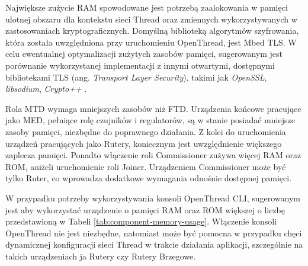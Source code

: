 Największe zużycie RAM spowodowane jest potrzebą zaalokowania w pamięci ulotnej obszaru dla kontekstu sieci Thread oraz zmiennych wykorzystywanych w zastosowaniach kryptograficznych. Domyślną biblioteką algorytmów szyfrowania, która została uwzględniona przy uruchomieniu OpenThread, jest Mbed TLS. W celu ewentualnej optymalizacji zużytych zasobów pamięci, sugerowanym jest porównanie wykorzystanej implementacji z innymi otwartymi, dostępnymi bibliotekami TLS (ang. \textit{Transport Layer Security}), takimi jak \textit{OpenSSL}, \textit{libsodium}, \textit{Crypto++} \cite{mbed-tls-alt}. 

Rola MTD wymaga mniejszych zasobów niż FTD. Urządzenia końcowe pracujące jako MED, pełniące rolę czujników i regulatorów, są w stanie posiadać mniejsze zasoby pamięci, niezbędne do poprawnego działania. Z kolei do uruchomienia urządzeń pracujących jako Rutery, koniecznym jest uwzględnienie większego zaplecza pamięci. Ponadto włączenie roli Commissioner zużywa więcej RAM oraz ROM, aniżeli uruchomienie roli Joiner. Urządzeniem Commissioner może być tylko Ruter, co wprowadza dodatkowe wymagania odnośnie dostępnej pamięci.

W przypadku potrzeby wykorzystywania konsoli OpenThread CLI, sugerowanym jest aby wykorzystać urządzenie o pamięci RAM oraz ROM większej o liczbę przedstawioną w Tabeli \ref{tab:component-memory-usage}. Włączenie konsoli OpenThread nie jest niezbędne, natomiast może być pomocna w przypadku chęci dynamicznej konfiguracji sieci Thread w trakcie działania aplikacji, szczególnie na takich urządzeniach ja Rutery czy Rutery Brzegowe.




